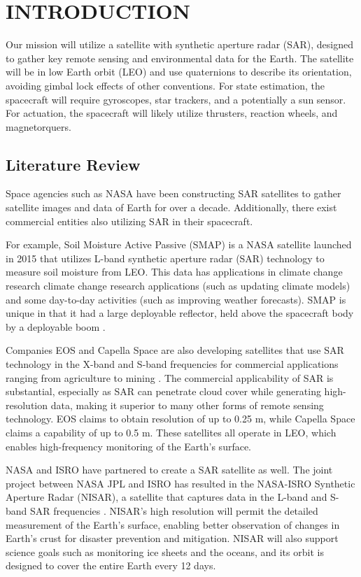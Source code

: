 \section{\Large INTRODUCTION}
Our mission will utilize a satellite with synthetic aperture radar (SAR), designed to gather key remote sensing and environmental data for the Earth. The satellite will be in low Earth orbit (LEO) and use quaternions to describe its orientation, avoiding gimbal lock effects of other conventions. For state estimation, the spacecraft will require gyroscopes, star trackers, and a potentially a sun sensor. For actuation, the spacecraft will likely utilize thrusters, reaction wheels, and magnetorquers.

\subsection{Literature Review}
Space agencies such as NASA have been constructing SAR satellites to gather satellite images and data of Earth for over a decade. Additionally, there exist commercial entities also utilizing SAR in their spacecraft.

For example, Soil Moisture Active Passive (SMAP) is a NASA satellite launched in 2015 that utilizes L-band synthetic aperture radar (SAR) technology to measure soil moisture from LEO. This data has applications in climate change research climate change research applications (such as updating climate models) and some day-to-day activities (such as improving weather forecasts). SMAP is unique in that it had a large deployable reflector, held above the spacecraft body by a deployable boom \cite{SMAP}.

Companies EOS and Capella Space are also developing satellites that use SAR technology in the X-band and S-band frequencies for commercial applications ranging from agriculture to mining \cite{EOSSAR, Capella}. The commercial applicability of SAR is substantial, especially as SAR can penetrate cloud cover while generating high-resolution data, making it superior to many other forms of remote sensing technology. EOS claims to obtain resolution of up to 0.25 m, while Capella Space claims a capability of up to 0.5 m. These satellites all operate in LEO, which enables high-frequency monitoring of the Earth's surface.

NASA and ISRO have partnered to create a SAR satellite as well. The joint project between NASA JPL and ISRO has resulted in the NASA-ISRO Synthetic Aperture Radar (NISAR), a satellite that captures data in the L-band and S-band SAR frequencies \cite{NISARMission}. NISAR's high resolution will permit the detailed measurement of the Earth's surface, enabling better observation of changes in Earth's crust for disaster prevention and mitigation. NISAR will also support science goals such as monitoring ice sheets and the oceans, and its orbit is designed to cover the entire Earth every 12 days.

